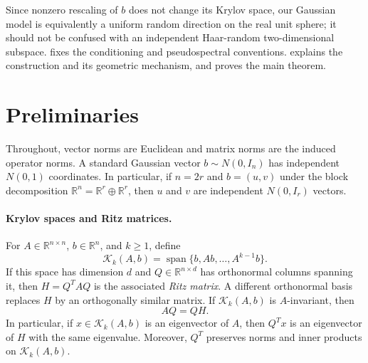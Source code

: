 \documentclass[11pt]{article}
\begin{document}
Since nonzero rescaling of $b$ does not change its Krylov space, our Gaussian
model is equivalently a uniform random direction on the real unit sphere; it
should not be confused with an independent Haar-random two-dimensional
subspace.   fixes the conditioning and pseudospectral
conventions.   explains the construction and its geometric
mechanism, and  proves the main theorem.

\section{Preliminaries}
\label{sec:preliminaries}

Throughout, vector norms are Euclidean and matrix norms are the induced
operator norms.  A standard Gaussian vector $b\sim N(0,I_n)$ has independent
$N(0,1)$ coordinates.  In particular, if $n=2r$ and $b=(u,v)$ under the block
decomposition $\mathbb R^n=\mathbb R^r\oplus\mathbb R^r$, then $u$ and $v$ are
independent $N(0,I_r)$ vectors.

\paragraph{Krylov spaces and Ritz matrices.}
For $A\in\mathbb R^{n\times n}$, $b\in\mathbb R^n$, and $k\geq1$, define
\[
  \mathcal K_k(A,b)
  =\operatorname{span}\{b,Ab,\ldots,A^{k-1}b\}.
\]
If this space has dimension $d$ and
$Q\in\mathbb R^{n\times d}$ has orthonormal columns spanning it, then
$H=Q^TAQ$ is the associated \emph{Ritz matrix}.  A different orthonormal basis
replaces $H$ by an orthogonally similar matrix.  If $\mathcal K_k(A,b)$ is
$A$-invariant, then
\begin{equation}
  AQ=QH.
  \label{eq:invariant-compression}
\end{equation}
In particular, if $x\in\mathcal K_k(A,b)$ is an eigenvector of $A$, then
$Q^Tx$ is an eigenvector of $H$ with the same eigenvalue.  Moreover, $Q^T$
preserves norms and inner products on $\mathcal K_k(A,b)$.
\end{document}
